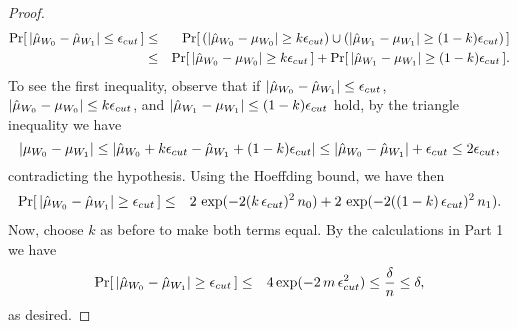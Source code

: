 \begin{proof}
\begin{eqnarray*}
\Pr [\, |\hat{\mu}_{W_0} - \hat{\mu}_{W_1}| \le  \epsilon_{cut} \,] &\le& 
\Pr [\, (|\hat{\mu}_{W_0} - {\mu}_{W_0}| \ge  k \epsilon_{cut} ) \cup (|\hat{\mu}_{W_1} - {\mu}_{W_1}| \ge  (1-k)\epsilon_{cut} )\,]  \\   
&\le&\Pr [\, |\hat{\mu}_{W_0} - {\mu}_{W_0}| \ge  k \epsilon_{cut} \,] +  
\Pr [\, |\hat{\mu}_{W_1} - {\mu}_{W_1}| \ge  (1-k) \epsilon_{cut} \,]. 
\end{eqnarray*}
%
To see the first inequality, observe that if $|\hat{\mu}_{W_0} - \hat{\mu}_{W_1}| \le  \epsilon_{cut}$, 
$|\hat{\mu}_{W_0} - {\mu}_{W_0}| \le  k \epsilon_{cut}$, 
and $|\hat{\mu}_{W_1} - {\mu}_{W_1}| \le  (1-k) \epsilon_{cut}$
hold, by the triangle inequality we have 
$$
|{\mu}_{W_0} - {\mu}_{W_1}| \le |\hat{\mu}_{W_0} + k\epsilon_{cut} - \hat{\mu}_{W_1} + (1-k)\epsilon_{cut}| 
\le |\hat{\mu}_{W_0}-\hat{\mu}_{W_1}| + \epsilon_{cut} \le 2\epsilon_{cut},$$
contradicting the hypothesis. 
Using the Hoeffding bound, we have then 
%
\begin{eqnarray*}
\Pr [\, |\hat{\mu}_{W_0} - \hat{\mu}_{W_1}| \ge  \epsilon_{cut} \,]   &\le&
2 \, \exp(-2(k\,\epsilon_{cut})^2 \, n_0) + 2 \, \exp(-2((1-k)\,\epsilon_{cut})^2 \, n_1). 
\end{eqnarray*} 
%
Now, choose $k$ as before to make both terms equal. By the calculations
in Part 1 we have 
%
\begin{eqnarray*}
\Pr [\, |\hat{\mu}_{W_0} - \hat{\mu}_{W_1}| \ge  \epsilon_{cut} \,]  &\le& 
4 \exp(-2 \, m \, \epsilon_{cut}^2) \le \frac{\delta}{n} \le \delta,
\end{eqnarray*} 
%
as desired. 

\end{proof}

